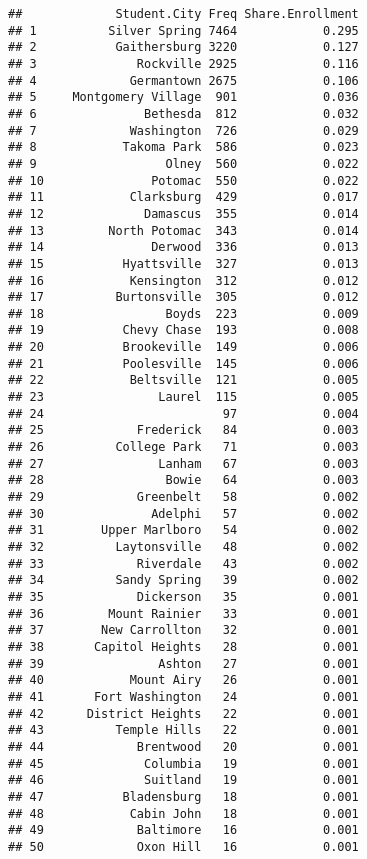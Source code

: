 \documentclass[]{article}
\begin{document}
\begin{verbatim}
##             Student.City Freq Share.Enrollment
## 1          Silver Spring 7464            0.295
## 2           Gaithersburg 3220            0.127
## 3              Rockville 2925            0.116
## 4             Germantown 2675            0.106
## 5     Montgomery Village  901            0.036
## 6               Bethesda  812            0.032
## 7             Washington  726            0.029
## 8            Takoma Park  586            0.023
## 9                  Olney  560            0.022
## 10               Potomac  550            0.022
## 11            Clarksburg  429            0.017
## 12              Damascus  355            0.014
## 13         North Potomac  343            0.014
## 14               Derwood  336            0.013
## 15           Hyattsville  327            0.013
## 16            Kensington  312            0.012
## 17          Burtonsville  305            0.012
## 18                 Boyds  223            0.009
## 19           Chevy Chase  193            0.008
## 20           Brookeville  149            0.006
## 21           Poolesville  145            0.006
## 22            Beltsville  121            0.005
## 23                Laurel  115            0.005
## 24                         97            0.004
## 25             Frederick   84            0.003
## 26          College Park   71            0.003
## 27                Lanham   67            0.003
## 28                 Bowie   64            0.003
## 29             Greenbelt   58            0.002
## 30               Adelphi   57            0.002
## 31        Upper Marlboro   54            0.002
## 32          Laytonsville   48            0.002
## 33             Riverdale   43            0.002
## 34          Sandy Spring   39            0.002
## 35             Dickerson   35            0.001
## 36         Mount Rainier   33            0.001
## 37        New Carrollton   32            0.001
## 38       Capitol Heights   28            0.001
## 39                Ashton   27            0.001
## 40            Mount Airy   26            0.001
## 41       Fort Washington   24            0.001
## 42      District Heights   22            0.001
## 43          Temple Hills   22            0.001
## 44             Brentwood   20            0.001
## 45              Columbia   19            0.001
## 46              Suitland   19            0.001
## 47           Bladensburg   18            0.001
## 48            Cabin John   18            0.001
## 49             Baltimore   16            0.001
## 50             Oxon Hill   16            0.001

\end{verbatim}
\end{document}
